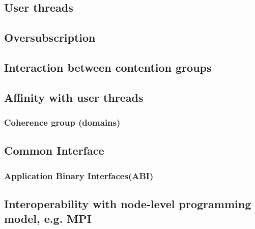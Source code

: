 
\subsection{User threads}


\subsection{Oversubscription}


\subsection{Interaction between contention groups}

\subsection{Affinity with user threads}
\subsubsection{Coherence group (domains)}

\subsection{Common Interface}
\subsubsection{Application Binary Interfaces(ABI)}

\subsection{Interoperability with node-level programming model, e.g. MPI}

